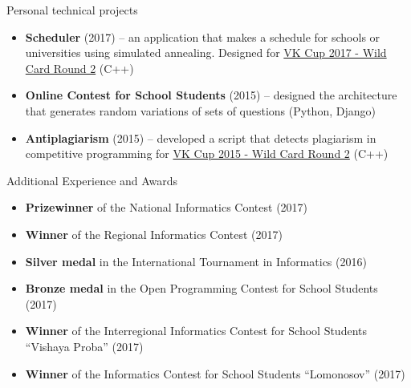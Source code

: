 \documentclass[]{mcdowellcv}
\begin{document}
	\begin{cvsection}{Personal technical projects}
            \vskip 0.1cm
            \begin{cvsubsection}{}{}{}
                    \begin{itemize}
                        \item \textbf{Scheduler} (2017) -- an application that makes a schedule for schools or universities using simulated annealing. Designed for \href{https://codeforces.com/contest/775/problem/A}{VK Cup 2017 - Wild Card Round 2} (C++)
                            \item \textbf{Online Contest for School Students} (2015) -- designed the architecture that generates random variations of sets of questions (Python, Django)
                            \item \textbf{Antiplagiarism} (2015) -- developed a script that detects plagiarism in competitive programming for \href{https://codeforces.com/contest/537/problem/A}{VK Cup 2015 - Wild Card Round 2} (C++)
                    \end{itemize}
            \end{cvsubsection}
	\end{cvsection}

	\begin{cvsection}{Additional Experience and Awards}
            \vskip 0.1cm
		\begin{cvsubsection}{}{}{}
			\begin{itemize}
                            \item \textbf{Prizewinner} of the National Informatics Contest (2017)
                            \item \textbf{Winner} of the Regional Informatics Contest (2017)
                            \item \textbf{Silver medal} in the International Tournament in Informatics (2016)
                            \item \textbf{Bronze medal} in the Open Programming Contest for School Students (2017)
                            \item \textbf{Winner} of the Interregional Informatics Contest for School Students ``Vishaya Proba'' (2017)
                            \item \textbf{Winner} of the Informatics Contest for School Students ``Lomonosov'' (2017)
			\end{itemize}
		\end{cvsubsection}
	\end{cvsection}
\end{document}
